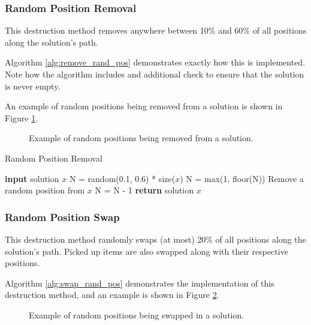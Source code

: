 \documentclass[conference]{IEEEtran}
\begin{document}
\subsubsection{Random Position Removal}

This destruction method removes anywhere between 10\% and 60\% of all positions along the solution's path.

Algorithm \ref{alg:remove_rand_pos} demonstrates exactly how this is implemented. Note how the algorithm includes and additional check to ensure that the solution is never empty.

An example of random positions being removed from a solution is shown in Figure \ref{fig:remove_rand_pos}.

\begin{figure}[ht]
  	  \centering
  	  
      \caption{Example of random positions being removed from a solution.}
      \label{fig:remove_rand_pos}
\end{figure}

\begin{algorithm}[h]
\caption{Random Position Removal}
\label{alg:remove_rand_pos}
\begin{algorithmic}[1]
\State \textbf{input} solution $x$
\State N = random(0.1, 0.6) * size($x$)
\State N = max(1, floor(N))
    \State Remove a random position from $x$
    \State N = N - 1
\EndWhile
\State \textbf{return} solution $x$
\end{algorithmic}
\end{algorithm}

\subsubsection{Random Position Swap}

This destruction method randomly swaps (at most) 20\% of all positions along the solution's path.  Picked up items are also swapped along with their respective positions. 

Algorithm \ref{alg:swap_rand_pos} demonstrates the implementation of this destruction method, and an example is shown in Figure \ref{fig:swap_rand_pos}.

\begin{figure}[h]
  	  \centering
      
      \caption{Example of random positions being swapped in a solution.}
      \label{fig:swap_rand_pos}
\end{figure}
\end{document}
